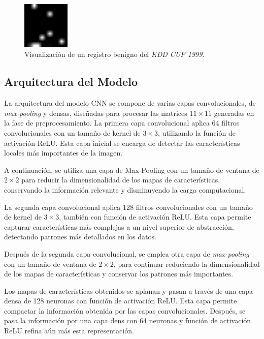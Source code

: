 \begin{figure}[H]
    \centering
    \includegraphics[width=0.2\textwidth]{img/descarga.png}
    \caption{Visualización de un registro benigno del \textit{KDD CUP 1999}.}
    \label{fig: kddimage}
\end{figure}


\subsection{Arquitectura del Modelo}

La arquitectura del modelo CNN se compone de varias capas convolucionales, de \textit{max-pooling} y densas, diseñadas para procesar las matrices \(11 \times 11\) generadas en la fase de preprocesamiento. La primera capa convolucional aplica 64 filtros convolucionales con un tamaño de kernel de \(3 \times 3\), utilizando la función de activación ReLU. Esta capa inicial se encarga de detectar las características locales más importantes de la imagen. 

A continuación, se utiliza una capa de Max-Pooling con un tamaño de ventana de \(2 \times 2\) para reducir la dimensionalidad de los mapas de características, conservando la información relevante y disminuyendo la carga computacional.

La segunda capa convolucional aplica 128 filtros convolucionales con un tamaño de kernel de \(3 \times 3\), también con función de activación ReLU. Esta capa permite capturar características más complejas a un nivel superior de abstracción, detectando patrones más detallados en los datos.

Después de la segunda capa convolucional, se emplea otra capa de \textit{max-pooling} con un tamaño de ventana de \(2 \times 2\), para continuar reduciendo la dimensionalidad de los mapas de características y conservar los patrones más importantes.

Los mapas de características obtenidos se aplanan y pasan a través de una capa densa de 128 neuronas con función de activación ReLU. Esta capa permite compactar la información obtenida por las capas convolucionales. Después, se pasa la información por una capa dens con 64 neuronas y función de activación ReLU refina aún más esta representación. 

